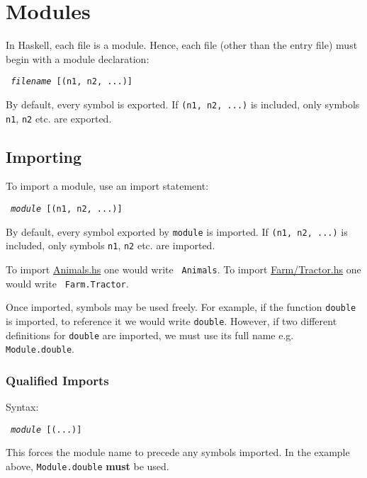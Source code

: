 \section{Modules}

In Haskell, each file is a module. Hence, each file (other than the entry file) must begin with a module declaration:

\begin{center}
  \texttt{ \textit{filename} [(n1, n2, ...)] }
\end{center}

By default, every symbol is exported. If \texttt{(n1, n2, ...)} is included, only symbols \texttt{n1}, \texttt{n2} etc. are exported.

\subsection{Importing}

To import a module, use an import statement:

\begin{center}
  \texttt{ \textit{module} [(n1, n2, ...)]}
\end{center}

By default, every symbol exported by \texttt{module} is imported. If \texttt{(n1, n2, ...)} is included, only symbols \texttt{n1}, \texttt{n2} etc. are imported.

To import \url{Animals.hs} one would write \texttt{ Animals}.
To import \url{Farm/Tractor.hs} one would write \texttt{ Farm.Tractor}.

Once imported, symbols may be used freely. For example, if the function \texttt{double} is imported, to reference it we would write \texttt{double}. However, if two different definitions for \texttt{double} are imported, we must use its full name e.g. \texttt{Module.double}.

\subsubsection{Qualified Imports}

Syntax:

\begin{center}
  \texttt{ \textit{module} [(...)]}
\end{center}

This forces the module name to precede any symbols imported. In the example above, \texttt{Module.double} \textbf{must} be used.

